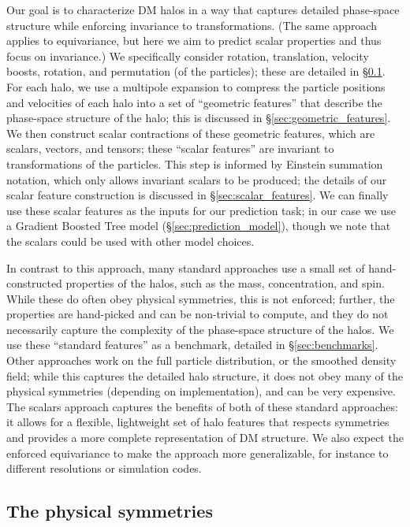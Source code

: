Our goal is to characterize DM halos in a way that captures detailed phase-space structure while enforcing invariance to transformations.
(The same approach applies to equivariance, but here we aim to predict scalar properties and thus focus on invariance.)
We specifically consider rotation, translation, velocity boosts, rotation, and permutation (of the particles); these are detailed in \S\ref{sec:symmetries}.
For each \dark halo, we use a multipole expansion to compress the particle positions and velocities of each halo into a set of ``geometric features'' that describe the phase-space structure of the halo; this is discussed in \S\ref{sec:geometric_features}.
We then construct scalar contractions of these geometric features, which are scalars, vectors, and tensors; these ``scalar features'' are invariant to transformations of the particles. 
This step is informed by Einstein summation notation, which only allows invariant scalars to be produced; the details of our scalar feature construction is discussed in \S\ref{sec:scalar_features}.
We can finally use these scalar features as the inputs for our prediction task; in our case we use a Gradient Boosted Tree model (\S\ref{sec:prediction_model}), though we note that the scalars could be used with other model choices.

In contrast to this approach, many standard approaches use a small set of hand-constructed properties of the halos, such as the mass, concentration, and spin.
While these do often obey physical symmetries, this is not enforced; further, the properties are hand-picked and can be non-trivial to compute, and they do not necessarily capture the complexity of the phase-space structure of the halos.
We use these ``standard features'' as a benchmark, detailed in \S\ref{sec:benchmarks}.
Other approaches work on the full particle distribution, or the smoothed density field; while this captures the detailed halo structure, it does not obey many of the physical symmetries (depending on implementation), and can be very expensive.
The scalars approach captures the benefits of both of these standard approaches: it allows for a flexible, lightweight set of halo features that respects symmetries and provides a more complete representation of DM structure.
We also expect the enforced equivariance to make the approach more generalizable, for instance to different resolutions or simulation codes.


\subsection{The physical symmetries}
\label{sec:symmetries}

